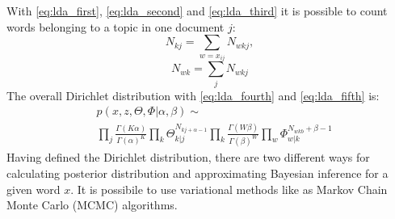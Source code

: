With \eqref{eq:lda_first}, \eqref{eq:lda_second} and \eqref{eq:lda_third} it is possible to count words belonging to a topic in one document $j$:
\begin{equation}\label{eq:lda_fourth}
    N_{kj}=\sum_{w=x_{ij}}N_{wkj},
\end{equation}
\begin{equation}\label{eq:lda_fifth}
    N_{wk}=\sum_{j}N_{wkj}
\end{equation}
The overall Dirichlet distribution with \eqref{eq:lda_fourth} and \eqref{eq:lda_fifth} is:
\footnotesize
\begin{equation}
     \begin{split}
     &p(x,z,\Theta,\Phi|\alpha,\beta)
     \sim\\
     &\prod_{j}\frac{\Gamma(K\alpha)}{\Gamma(\alpha)^K}\prod_k\Theta_{k|j}^{N_{kj+\alpha-1}}\prod_k\frac{\Gamma(W\beta)}{\Gamma(\beta)^W}\prod_w\Phi_{w|k}^{N_{wkb}+\beta-1}
     \end{split}
\end{equation}
\normalsize
Having defined the Dirichlet distribution, there are two different ways for calculating posterior distribution and approximating Bayesian inference for a given word $x$. It is possibile to use variational methods like as Markov Chain Monte Carlo (MCMC) algorithms. 

